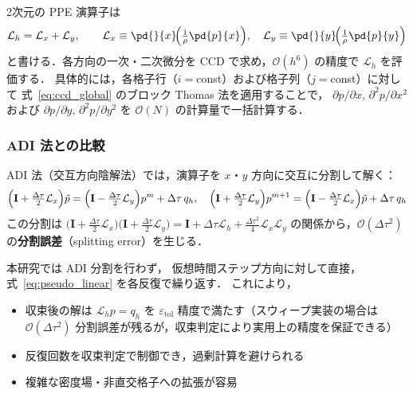 2次元の PPE 演算子は
\begin{equation}
  \mathcal{L}_h = \mathcal{L}_x + \mathcal{L}_y,
  \qquad
  \mathcal{L}_x \equiv \pd{}{x}\!\Bigl(\tfrac{1}{\rho}\pd{p}{x}\Bigr),\quad
  \mathcal{L}_y \equiv \pd{}{y}\!\Bigl(\tfrac{1}{\rho}\pd{p}{y}\Bigr)
  \label{eq:L_split}
\end{equation}
と書ける．各方向の一次・二次微分を CCD で求め，$\mathcal{O}(h^6)$ の精度で $\mathcal{L}_h$ を評価する．
具体的には，各格子行（$i=$const）および格子列（$j=$const）に対して
式~\eqref{eq:ccd_global} のブロック Thomas 法を適用することで，
$\partial p/\partial x,\,\partial^2 p/\partial x^2$ および $\partial p/\partial y,\,\partial^2 p/\partial y^2$ を
$\mathcal{O}(N)$ の計算量で一括計算する．

\subsubsection{ADI 法との比較}

ADI 法（交互方向陰解法）では，演算子を $x$・$y$ 方向に交互に分割して解く：
\begin{equation}
  \Bigl(\mathbf{I} + \tfrac{\Delta\tau}{2}\mathcal{L}_x\Bigr)\tilde{p}
  = \Bigl(\mathbf{I} - \tfrac{\Delta\tau}{2}\mathcal{L}_y\Bigr)p^m + \Delta\tau\, q_h,
  \quad
  \Bigl(\mathbf{I} + \tfrac{\Delta\tau}{2}\mathcal{L}_y\Bigr)p^{m+1}
  = \Bigl(\mathbf{I} - \tfrac{\Delta\tau}{2}\mathcal{L}_x\Bigr)\tilde{p} + \Delta\tau\, q_h
  \label{eq:ADI}
\end{equation}
この分割は
$
  \bigl(\mathbf{I}+\tfrac{\Delta\tau}{2}\mathcal{L}_x\bigr)
  \bigl(\mathbf{I}+\tfrac{\Delta\tau}{2}\mathcal{L}_y\bigr)
  = \mathbf{I} + \Delta\tau\mathcal{L}_h + \tfrac{\Delta\tau^2}{4}\mathcal{L}_x\mathcal{L}_y
$
の関係から，$\mathcal{O}(\Delta\tau^2)$ の\textbf{分割誤差}（splitting error）を生じる．

本研究では ADI 分割を行わず，
仮想時間ステップ方向に対して直接，式~\eqref{eq:pseudo_linear} を各反復で繰り返す．
これにより，

\begin{itemize}
  \item 収束後の解は $\mathcal{L}_h p = q_h$ を $\varepsilon_\text{tol}$ 精度で満たす（スウィープ実装の場合は $\mathcal{O}(\Delta\tau^2)$ 分割誤差が残るが，収束判定により実用上の精度を保証できる）
  \item 反復回数を収束判定で制御でき，過剰計算を避けられる
  \item 複雑な密度場・非直交格子への拡張が容易
\end{itemize}

